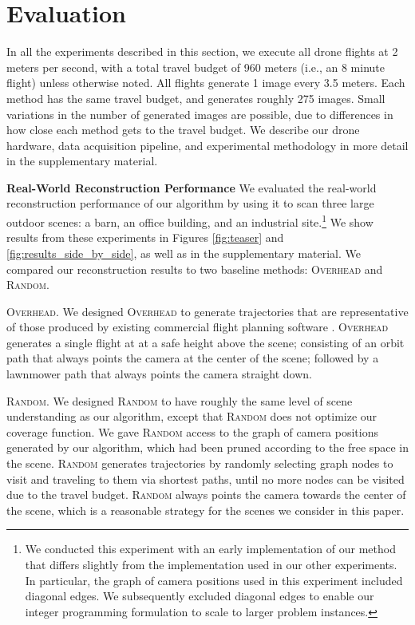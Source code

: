 \vspace{-5pt}
\section{Evaluation}

\vspace{-1pt}
In all the experiments described in this section, we execute all drone flights at 2 meters per second, with a total travel budget of 960 meters (i.e., an 8 minute flight) unless otherwise noted.
All flights generate 1 image every 3.5 meters.
Each method has the same travel budget, and generates roughly 275 images.
Small variations in the number of generated images are possible, due to differences in how close each method gets to the travel budget.
We describe our drone hardware, data acquisition pipeline, and experimental methodology in more detail in the supplementary material.

\vspace{3pt}
\textbf{Real-World Reconstruction Performance}
We evaluated the real-world reconstruction performance of our algorithm by using it to scan three large outdoor scenes: a barn, an office building, and an industrial site.\footnote{We
conducted this experiment with an early implementation of our method that differs slightly from the implementation used in our other experiments.
In particular, the graph of camera positions used in this experiment included diagonal edges.
We subsequently excluded diagonal edges to enable our integer programming formulation to scale to larger problem instances. 
}
We show results from these experiments in Figures \ref{fig:teaser} and \ref{fig:results_side_by_side}, as well as in the supplementary material.
We compared our reconstruction results to two baseline methods: \textsc{Overhead} and \textsc{Random}.

\textsc{Overhead}.
We designed \textsc{Overhead} to generate trajectories that are representative of those produced by existing commercial flight planning software \cite{3dr:2017a,pix4d:2017a}.
\textsc{Overhead} generates a single flight at at a safe height above the scene; consisting of an orbit path that always points the camera at the center of the scene; followed by a lawnmower path that always points the camera straight down.

\textsc{Random}.
We designed \textsc{Random} to have roughly the same level of scene understanding as our algorithm, except that \textsc{Random} does not optimize our coverage function.
We gave \textsc{Random} access to the graph of camera positions generated by our algorithm, which had been pruned according to the free space in the scene.
\textsc{Random} generates trajectories by randomly selecting graph nodes to visit and traveling to them via shortest paths, until no more nodes can be visited due to the travel budget.
\textsc{Random} always points the camera towards the center of the scene, which is a reasonable strategy for the scenes we consider in this paper.

